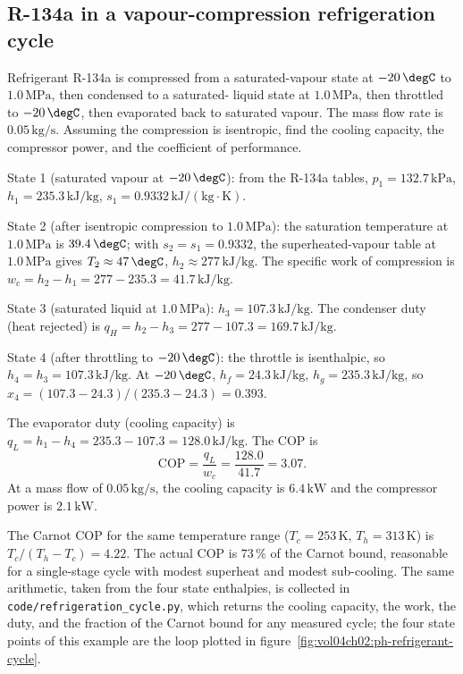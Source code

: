 \subsection{R-134a in a vapour-compression refrigeration cycle}

Refrigerant R-134a is compressed from a saturated-vapour state at
$-20\,\degC$ to $1.0\,\text{MPa}$, then condensed to a saturated-
liquid state at $1.0\,\text{MPa}$, then throttled to $-20\,\degC$,
then evaporated back to saturated vapour. The mass flow rate is $0.05
\,\text{kg}/\text{s}$. Assuming the compression is isentropic, find
the cooling capacity, the compressor power, and the coefficient of
performance.

State 1 (saturated vapour at $-20\,\degC$): from the R-134a tables,
$p_1 = 132.7\,\text{kPa}$, $h_1 = 235.3\,\text{kJ}/\text{kg}$, $s_1 =
0.9332\,\text{kJ}/(\text{kg}\cdot\si{\kelvin})$.

State 2 (after isentropic compression to $1.0\,\text{MPa}$): the
saturation temperature at $1.0\,\text{MPa}$ is $39.4\,\degC$; with
$s_2 = s_1 = 0.9332$, the superheated-vapour table at $1.0\,\text{MPa}$
gives $T_2 \approx 47\,\degC$, $h_2 \approx 277\,\text{kJ}/\text{kg}$.
The specific work of compression is $w_c = h_2 - h_1 = 277 - 235.3 =
41.7\,\text{kJ}/\text{kg}$.

State 3 (saturated liquid at $1.0\,\text{MPa}$): $h_3 = 107.3\,\text{kJ}/
\text{kg}$. The condenser duty (heat rejected) is $q_H = h_2 - h_3 =
277 - 107.3 = 169.7\,\text{kJ}/\text{kg}$.

State 4 (after throttling to $-20\,\degC$): the throttle is isenthalpic,
so $h_4 = h_3 = 107.3\,\text{kJ}/\text{kg}$. At $-20\,\degC$, $h_f =
24.3\,\text{kJ}/\text{kg}$, $h_g = 235.3\,\text{kJ}/\text{kg}$, so
$x_4 = (107.3 - 24.3)/(235.3 - 24.3) = 0.393$.

The evaporator duty (cooling capacity) is $q_L = h_1 - h_4 = 235.3 -
107.3 = 128.0\,\text{kJ}/\text{kg}$. The COP is
\[
\text{COP} = \frac{q_L}{w_c} = \frac{128.0}{41.7} = 3.07.
\]
At a mass flow of $0.05\,\text{kg}/\text{s}$, the cooling capacity is
$6.4\,\text{kW}$ and the compressor power is $2.1\,\text{kW}$.

The Carnot COP for the same temperature range ($T_c = 253\,\si{\kelvin}$,
$T_h = 313\,\si{\kelvin}$) is $T_c/(T_h - T_c) = 4.22$. The actual COP
is $73\,\%$ of the Carnot bound, reasonable for a single-stage cycle
with modest superheat and modest sub-cooling. The same arithmetic, taken
from the four state enthalpies, is collected in
\texttt{code/refrigeration\_cycle.py}, which returns the cooling
capacity, the work, the duty, and the fraction of the Carnot bound for
any measured cycle; the four state points of this example are the loop
plotted in figure~\ref{fig:vol04ch02:ph-refrigerant-cycle}.

